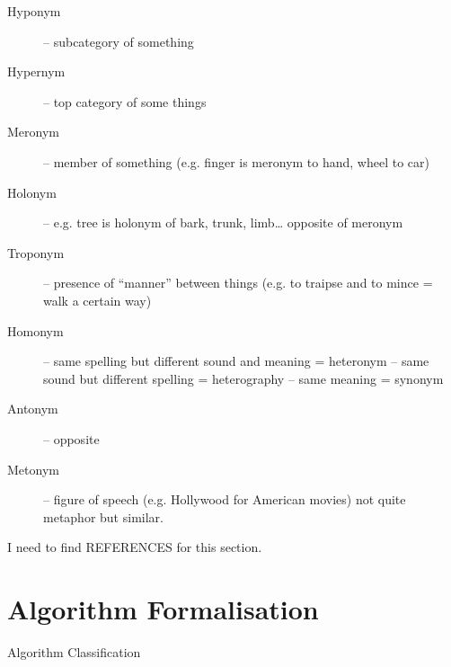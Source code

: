 \begin{description}
  \item [Hyponym] – subcategory of something
  \item [Hypernym] – top category of some things
  \item [Meronym] – member of something (e.g. finger is meronym to hand, wheel to car)
  \item [Holonym] – e.g. tree is holonym of bark, trunk, limb… opposite of meronym
  \item [Troponym] – presence of “manner” between things (e.g. to traipse and to mince = walk a certain way)
  \item [Homonym] – same spelling but different sound and meaning = heteronym – same sound but different spelling = heterography – same meaning = synonym
  \item [Antonym] – opposite
  \item [Metonym] – figure of speech (e.g. Hollywood for American movies) not quite metaphor but similar.
\end{description}

I need to find REFERENCES for this section.



\section{Algorithm Formalisation}

Algorithm Classification

